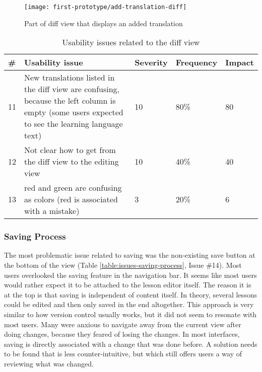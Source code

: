 \begin{figure}[h!]
 \centering
 \texttt{[image: first-prototype/add-translation-diff]}
 \caption{Part of diff view that displays an added translation}
 \label{fig:add-translation-diff}
\end{figure}

\begin{table}[h!]
\centering
\begin{tabular}{|l|p{7cm}|l|l|l|}
\hline
\rowcolor[HTML]{EFEFEF}
\textbf{\#} & \textbf{Usability issue} & \textbf{Severity} & \textbf{Frequency} & \textbf{Impact} \\ \hline
11 & New translations listed in the diff view are confusing, because the left column is empty (some users expected to see the learning language text) & 10 & 80\% & 80 \\ \hline
12 & Not clear how to get from the diff view to the editing view & 10 & 40\% & 40 \\ \hline
13 & red and green are confusing as colors (red is associated with a mistake) & 3 & 20\% & 6 \\ \hline
\end{tabular}
\caption{Usability issues related to the diff view}
\label{table:issues-diff}
\end{table}


\subsubsection{Saving Process}
The most problematic issue related to saving was the non-existing save button at the bottom of the view (Table \ref{table:issues-saving-process}, Issue \#14). Most users overlooked the saving feature in the navigation bar. It seems like most users would rather expect it to be attached to the lesson editor itself. The reason it is at the top is that saving is independent of content itself. In theory, several lessons could be edited and then only saved in the end altogether. This approach is very similar to how version control usually works, but it did not seem to resonate with most users. Many were anxious to navigate away from the current view after doing changes, because they feared of losing the changes. In most interfaces, saving is directly associated with a change that was done before. A solution needs to be found that is less counter-intuitive, but which still offers users a way of reviewing what was changed.

